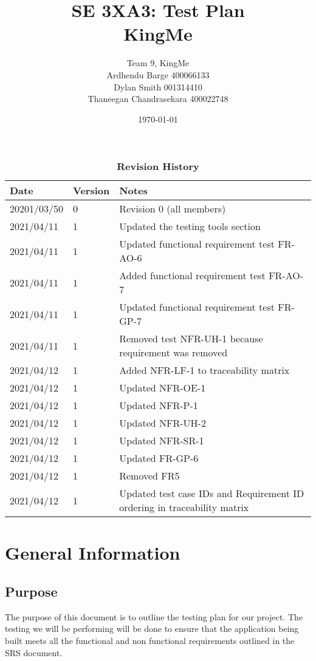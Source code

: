 \documentclass[12pt, titlepage]{article}
\title{SE 3XA3: Test Plan\\KingMe}
\author{Team 9, KingMe
		\\ Ardhendu Barge 400066133
		\\ Dylan Smith 001314410
		\\ Thaneegan Chandrasekara 400022748
}
\date{\today}
\begin{document}
\maketitle

\tableofcontents
\listoftables
\listoffigures

\begin{table}[bp]
\caption{\bf Revision History}
\begin{tabularx}{\textwidth}{p{3cm}p{2cm}X}
\toprule {\bf Date} & {\bf Version} & {\bf Notes}\\
\midrule
20201/03/50 & 0 & Revision 0 (all members)\\
2021/04/11 & 1 & Updated the testing tools section\\
2021/04/11 & 1 & Updated functional requirement test FR-AO-6\\
2021/04/11 & 1 & Added functional requirement test FR-AO-7\\
2021/04/11 & 1 & Updated functional requirement test FR-GP-7\\
2021/04/11 & 1 & Removed test NFR-UH-1 because requirement was removed\\
2021/04/12 & 1 & Added NFR-LF-1 to traceability matrix\\
2021/04/12 & 1 & Updated NFR-OE-1\\
2021/04/12 & 1 & Updated NFR-P-1\\
2021/04/12 & 1 & Updated NFR-UH-2\\
2021/04/12 & 1 & Updated NFR-SR-1\\
2021/04/12 & 1 & Updated FR-GP-6\\
2021/04/12 & 1 & Removed FR5\\
2021/04/12 & 1 & Updated test case IDs and Requirement ID ordering in traceability matrix\\

\bottomrule
\end{tabularx}
\end{table}

\newpage


\section{General Information}

\subsection{Purpose}
The purpose of this document is to outline the testing plan for our project. The testing we will be performing will be done to ensure that the application being built meets all the functional and non functional requirements outlined in the SRS document. 
\end{document}
